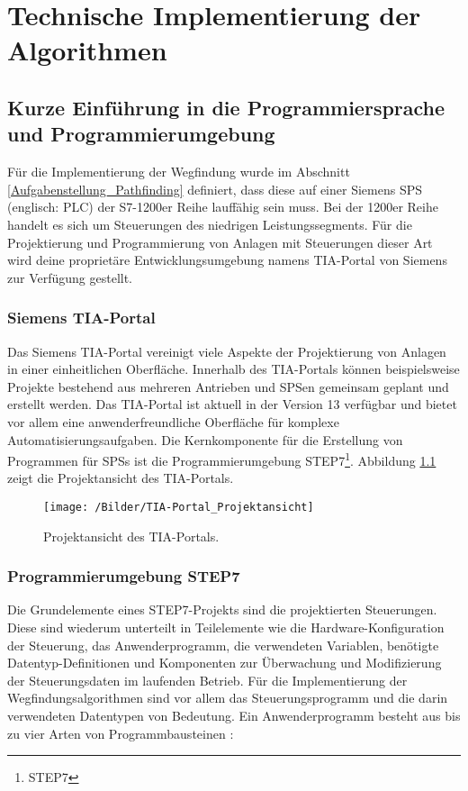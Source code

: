 \chapter{Technische Implementierung der Algorithmen}
	\label{Implementierung}
	\section{Kurze Einführung in die Programmiersprache und Programmierumgebung}
	
		Für die Implementierung der Wegfindung wurde im Abschnitt \ref{Aufgabenstellung_Pathfinding} definiert, dass diese auf einer Siemens \ac{SPS} (englisch: \ac{PLC})  der S7-1200er Reihe lauffähig sein muss. Bei der 1200er Reihe handelt es sich um  Steuerungen des niedrigen Leistungssegments. Für die Projektierung und Programmierung von Anlagen mit Steuerungen dieser Art wird deine proprietäre Entwicklungsumgebung namens \ac{TIA-Portal} von Siemens zur Verfügung gestellt.
		
		\subsection{Siemens TIA-Portal}
		
			Das Siemens \ac{TIA-Portal} vereinigt viele Aspekte der Projektierung von Anlagen in einer einheitlichen Oberfläche. Innerhalb des \ac{TIA-Portal}s können beispielsweise Projekte bestehend aus mehreren Antrieben und \ac{SPS}en gemeinsam geplant und erstellt werden. Das  \ac{TIA-Portal} ist aktuell in der Version 13 verfügbar und bietet vor allem eine anwenderfreundliche Oberfläche für komplexe Automatisierungsaufgaben. Die Kernkomponente für die Erstellung von Programmen für \aclp{SPS} ist die Programmierumgebung \acs{STEP7}\footnote{\ac{STEP7}}. Abbildung \ref{Projektansicht} zeigt die Projektansicht des \ac{TIA-Portal}s.
			
			\begin{figure}
				\centering
				\texttt{[image: /Bilder/TIA-Portal\_Projektansicht]}
				\vspace{0.2cm}
				\caption{Projektansicht des \ac{TIA-Portal}s.}\label{Projektansicht}
			\end{figure}
			
		
		\subsection{Programmierumgebung STEP7}
			Die Grundelemente eines \ac{STEP7}-Projekts sind die projektierten Steuerungen. Diese sind wiederum unterteilt in Teilelemente wie die Hardware-Konfiguration der Steuerung, das Anwenderprogramm, die verwendeten Variablen, benötigte Datentyp-Definitionen und Komponenten zur Überwachung und Modifizierung der Steuerungsdaten im laufenden Betrieb. Für die Implementierung der Wegfindungsalgorithmen sind vor allem das Steuerungsprogramm und die darin verwendeten Datentypen von Bedeutung. Ein Anwenderprogramm besteht aus bis zu vier Arten von Programmbausteinen \cite{STEP7Prog}:\\
					
